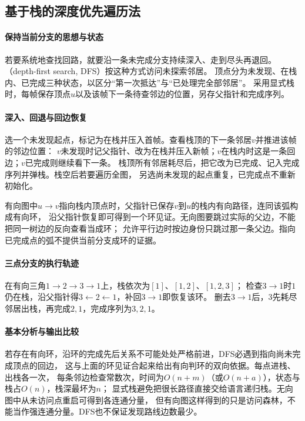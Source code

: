 \subsection{基于栈的深度优先遍历法}
\label{sec:graph-theory-dfs}

\paragraph{保持当前分支的思想与状态}
若要系统地查找回路，就要沿一条未完成分支持续深入、走到尽头再退回。
（depth-first search, DFS）按这种方式访问未探索邻居。
顶点分为未发现、在栈内、已完成三种状态，以区分“第一次抵达”与“已处理完全部邻居”。
采用显式栈时，每帧保存顶点$u$以及该帧下一条待查邻边的位置，另存父指针和完成序列。

\paragraph{深入、回退与回边恢复}
\begin{algorithm}[基于显式栈的深度优先遍历]
  选一个未发现起点，标记为在栈并压入首帧。查看栈顶的下一条邻居$v$并推进该帧的邻边位置：
  $v$未发现时记父指针、改为在栈并压入新帧；$v$在栈内时这是一条回边；$v$已完成则继续看下一条。
  栈顶所有邻居耗尽后，把它改为已完成、记入完成序列并弹栈。栈空后若要遍历全图，
  另选尚未发现的起点重复，已完成点不重新初始化。
\end{algorithm}
有向图中$u\to v$指向栈内顶点时，父指针已保存$v$到$u$的栈内有向路径，连同该弧构成有向环，
沿父指针恢复即可得到一个环见证。无向图要跳过实际的父边，不能把同一树边的反向查看当成环；
允许平行边时按边身份只跳过那一条父边。指向已完成点的弧不提供当前分支成环的证据。

\paragraph{三点分支的执行轨迹}
在有向三角$1\to2\to3\to1$上，栈依次为$[1]$、$[1,2]$、$[1,2,3]$；
检查$3\to1$时$1$仍在栈，沿父指针得$3\leftarrow2\leftarrow1$，补回$3\to1$即恢复该环。
删去$3\to1$后，$3$先耗尽邻居出栈，再完成$2,1$，完成序列为$3,2,1$。

\paragraph{基本分析与输出比较}
若存在有向环，沿环的完成先后关系不可能处处严格前进，DFS必遇到指向尚未完成顶点的回边，
这与上面的环见证合起来给出有向判环的双向依据。每点进栈、出栈各一次，
每条邻边检查常数次，时间为$O(n+m)$（或$O(n+a)$），状态与栈占$O(n)$，栈深最坏为$n$；
显式栈避免把很长路径直接交给语言递归栈。无向图中从未访问点重启可得到各连通分量，
但有向图这样得到的只是访问森林，不能当作强连通分量。DFS也不保证发现路线边数最少。

